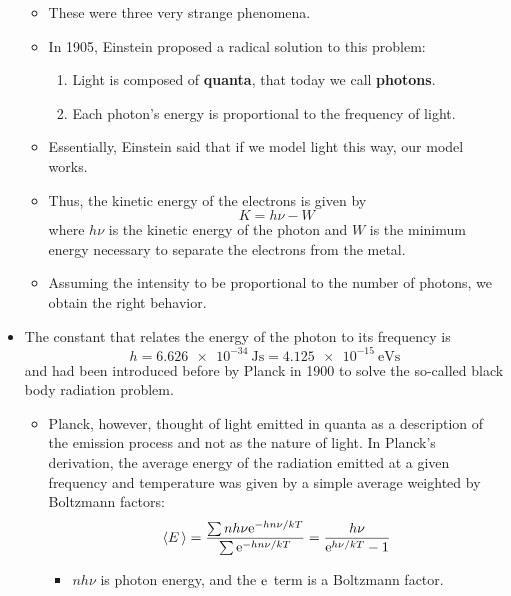 \documentclass[../notes.tex]{subfiles}
\begin{document}
\begin{itemize}
\begin{itemize}
        \item These were three very strange phenomena.
        \item In 1905, Einstein proposed a radical solution to this problem:
        \begin{enumerate}
            \item Light is composed of \textbf{quanta}, that today we call \textbf{photons}.
            \item Each photon's energy is proportional to the frequency of light.
        \end{enumerate}
        \item Essentially, Einstein said that if we model light this way, our model works.
        \item Thus, the kinetic energy of the electrons is given by
        \begin{equation*}
            K = h\nu-W
        \end{equation*}
        where $h\nu$ is the kinetic energy of the photon and $W$ is the minimum energy necessary to separate the electrons from the metal.
        \item Assuming the intensity to be proportional to the number of photons, we obtain the right behavior.
    \end{itemize}
    \item The constant that relates the energy of the photon to its frequency is
    \begin{equation*}
        h = \SI{6.626e-34}{\joule\second}
        = \SI{4.125e-15}{\electronvolt\second}
    \end{equation*}
    and had been introduced before by Planck in 1900 to solve the so-called black body radiation problem.
    \begin{itemize}
        \item Planck, however, thought of light emitted in quanta as a description of the emission process and not as the nature of light. In Planck's derivation, the average energy of the radiation emitted at a given frequency and temperature was given by a simple average weighted by Boltzmann factors:
        \begin{equation*}
            \Exp{E} = \frac{\sum nh\nu\e[-hn\nu/kT]}{\sum\e[-hn\nu/kT]}
            = \frac{h\nu}{\e[h\nu/kT]-1}
        \end{equation*}
        \begin{itemize}
            \item $nh\nu$ is photon energy, and the $\e$ term is a Boltzmann factor.

\end{itemize}
\end{itemize}
\end{itemize}
\end{document}
